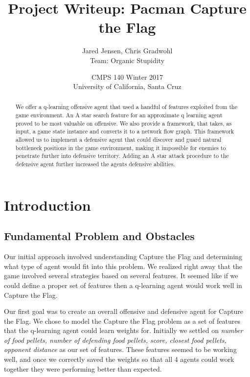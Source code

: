 \documentclass[11pt]{article}
\begin{document}
\title{Project Writeup: Pacman Capture the Flag}
\author{Jared Jensen, Chris Gradwohl \\ Team: Organic Stupidity}
\date{CMPS 140 Winter 2017 \\ University of California, Santa Cruz}
\maketitle


\begin{abstract}
	We offer a q-learning offensive agent that used a handful of features
	exploited from the game environment. An A star search feature for an
	approximate q learning agent proved to be most valuable on offensive.
	We also provide a framework, that takes, as input, a game state instance
	and converts it to a network flow graph. This framework allowed us to
	implement a defensive agent that could discover and guard natural bottleneck
	positions in the game environment, making it impossible for enemies to penetrate
	further into defensive territory. Adding an A star attack procedure to the
	defensive agent further increased the agents defensive abilities.
\end{abstract}

\newpage

\section{Introduction}
\subsection{Fundamental Problem and Obstacles}
Our initial approach involved understanding Capture the Flag and determining
what type of agent would fit into this problem. We realized right away that
the game involved several strategies based on several features. It seemed like
if we could define a proper set of features then a q-learning agent would work
well in Capture the Flag. \

Our first goal was to create an overall offensive and defensive agent for Capture the Flag. We
chose to model the Capture the Flag problem as a set of features that the q-learning agent
could learn weights for. Initially we settled on \textit{number of food pellets, number of defending food pellets, score,
closest food pellets, opponent distance} as our set of features. These features seemed
to be working well, and once we correctly saved the weights so that all 4 agents could work together
they were performing better than expected. \
\end{document}
